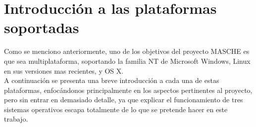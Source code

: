 \section{Introducción a las plataformas soportadas}

Como se menciono anteriormente, uno de los objetivos del proyecto MASCHE es que
sea multiplataforma, soportando la familia NT de Microsoft Windows, Linux en
sus versiones mas recientes, y OS X.\\

A continuación se presenta una breve introducción a cada una de estas
plataformas, enfocándonos principalmente en los aspectos pertinentes al
proyecto, pero sin entrar en demasiado detalle, ya que explicar el
funcionamiento de tres sistemas operativos escapa totalmente de lo que se
pretende hacer en este trabajo.\\

